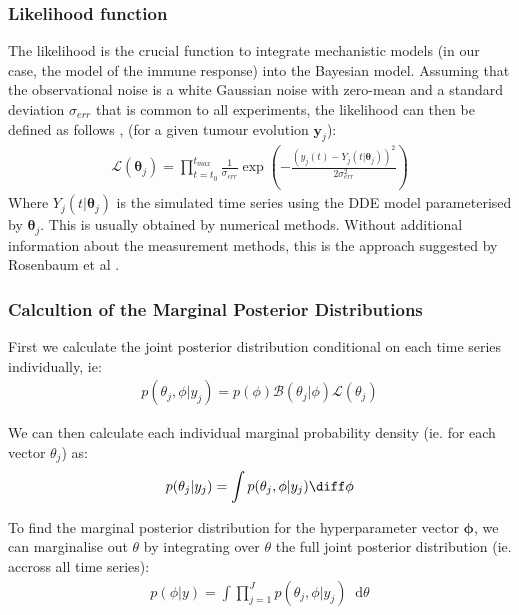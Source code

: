 \documentclass[11pt]{article}
\newcommand*\dif{\mathop{}\!\mathrm{d}}
\begin{document}
\subsubsection{Likelihood function}
The likelihood is the crucial function to integrate mechanistic models (in our case, the model of the immune response) into the Bayesian model. Assuming that the observational noise is a white Gaussian noise with zero-mean and a standard deviation $\sigma_{err}$ that is common to all experiments, the likelihood can then be defined as follows \cite{liu_wang}, \cite{likelihood_2} (for a given tumour evolution $\boldsymbol{y}_j$):
\begin{align*}
    \mathcal{L}(\boldsymbol{\theta}_j) = \prod_{t=t_0}^{t_{max}} \frac{1}{\sigma_{err}} \exp\left(-\frac{(y_{j}(t) - Y_j(t|\boldsymbol{\theta}_j))^2}{2\sigma_{err}^2}\right)  
\end{align*}
Where $Y_j(t|\boldsymbol{\theta}_j)$ is the simulated time series using the DDE model parameterised by $\boldsymbol{\theta}_j$. This is usually obtained by numerical methods. Without additional information about the measurement methods, this is the approach suggested by Rosenbaum et al \cite{rosenbaum}.

\subsubsection{Calcultion of the Marginal Posterior Distributions}
First we calculate the joint posterior distribution conditional on each time series individually, ie:
\begin{align*}
    p(\theta_j,\phi|y_j) = p(\phi) \mathcal{B}(\theta_j|\phi) \mathcal{L}(\theta_j)
\end{align*}

We can then calculate each individual marginal probability density (ie. for each vector $\theta_j$) as:\\ 
\begin{align*}
    p(\theta_j|y_j) = \int p(\theta_j, \phi|y_j) \diff \phi 
\end{align*}


To find the marginal posterior distribution for the hyperparameter vector $\boldsymbol{\phi}$, we can marginalise out $\theta$ by integrating over $\theta$ the full joint posterior distribution (ie. accross all time series):
\begin{align*}
    p(\phi|y) = \int \prod_{j=1}^{J} p(\theta_j, \phi|y_j) \dif \theta 
\end{align*}
\end{document}
